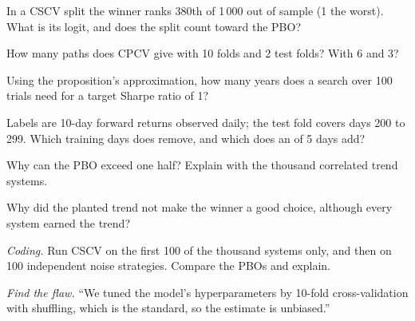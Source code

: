 \begin{exercise}[$\star$]\label{exo:rs:overfitting:1}
In a CSCV split the  winner ranks 380th of 1\,000 out of sample (1 the worst). What is its logit, and does the split count toward the PBO?
\end{exercise}

\begin{exercise}[$\star$]\label{exo:rs:overfitting:2}
How many  paths does CPCV give with 10 folds and 2 test folds? With 6 and 3?
\end{exercise}

\begin{exercise}[$\star$]\label{exo:rs:overfitting:3}
Using the proposition's approximation, how many years does a search over 100 trials need for a target Sharpe ratio of 1?
\end{exercise}

\begin{exercise}[$\star\star$]\label{exo:rs:overfitting:4}
Labels are 10-day forward returns observed daily; the test fold covers days 200 to 299. Which training days does  remove, and which does an  of
5 days add?
\end{exercise}

\begin{exercise}[$\star\star$]\label{exo:rs:overfitting:5}
Why can the PBO exceed one half? Explain with the thousand correlated trend systems.
\end{exercise}

\begin{exercise}[$\star\star$]\label{exo:rs:overfitting:6}
Why did the planted trend not make the  winner a good choice, although every system earned the trend?
\end{exercise}

\begin{exercise}[$\star\star\star$]\label{exo:rs:overfitting:7}
\emph{Coding.} Run CSCV on the first 100 of the thousand systems only, and then on 100 independent noise strategies. Compare the PBOs and explain.
\end{exercise}

\begin{exercise}[$\star\star\star$]\label{exo:rs:overfitting:8}
\emph{Find the flaw.} ``We tuned the model's hyperparameters by 10-fold cross-validation with shuffling, which is the standard, so the  estimate is
unbiased.''
\end{exercise}

